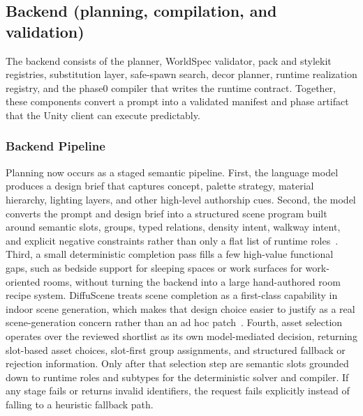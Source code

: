 \documentclass[12pt]{article}
\begin{document}
\subsection{Backend (planning, compilation, and validation)}
The backend consists of the planner, WorldSpec validator, pack and stylekit registries, substitution layer, safe-spawn search, decor planner, runtime realization registry, and the phase0 compiler that writes the runtime contract. Together, these components convert a prompt into a validated manifest and phase artifact that the Unity client can execute predictably.

\subsubsection{Backend Pipeline}
Planning now occurs as a staged semantic pipeline. First, the language model produces a design brief that captures concept, palette strategy, material hierarchy, lighting layers, and other high-level authorship cues. Second, the model converts the prompt and design brief into a structured scene program built around semantic slots, groups, typed relations, density intent, walkway intent, and explicit negative constraints rather than only a flat list of runtime roles~\cite{Feng_2023_NeurIPS_LayoutGPT, Yang_2024_CVPR}. Third, a small deterministic completion pass fills a few high-value functional gaps, such as bedside support for sleeping spaces or work surfaces for work-oriented rooms, without turning the backend into a large hand-authored room recipe system. DiffuScene treats scene completion as a first-class capability in indoor scene generation, which makes that design choice easier to justify as a real scene-generation concern rather than an ad hoc patch~\cite{Tang_2024_CVPR_DiffuScene}. Fourth, asset selection operates over the reviewed shortlist as its own model-mediated decision, returning slot-based asset choices, slot-first group assignments, and structured fallback or rejection information. Only after that selection step are semantic slots grounded down to runtime roles and subtypes for the deterministic solver and compiler. If any stage fails or returns invalid identifiers, the request fails explicitly instead of falling to a heuristic fallback path.
\end{document}
